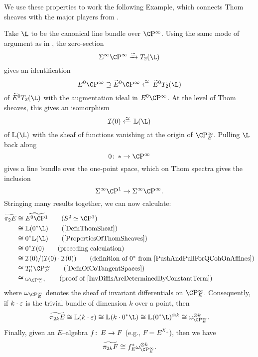 We use these properties to work the following Example, which connects Thom sheaves with the major players from .

\begin{example}\label{Pi2AndInvariantDiffls}
Take \(\L\) to be the canonical line bundle over \(\CP^\infty\).  Using the same mode of argument as in , the zero-section \[\Susp^\infty \CP^\infty \xrightarrow{\simeq} T_2(\L)\] gives an identification \[E^0 \CP^\infty \supseteq \widetilde E^0 \CP^\infty \xleftarrow{\simeq} \widetilde E^0 T_2(\L)\] of \(\widetilde E^0 T_2(\L)\) with the augmentation ideal in \(E^0 \CP^\infty\).  At the level of Thom sheaves, this gives an isomorphism \[\sheaf I(0) \xleftarrow{\simeq} \ThomSheaf{\L}\] of \(\ThomSheaf{\L}\) with the sheaf of functions vanishing at the origin of \(\CP^\infty_E\).  Pulling \(\L\) back along \[0\co * \to \CP^\infty\] gives a line bundle over the one-point space, which on Thom spectra gives the inclusion \[\Susp^\infty \CP^1 \to \Susp^\infty \CP^\infty.\]  Stringing many results together, we can now calculate:
\begin{align*}
\widetilde{\pi_2 E} & \cong \widetilde{E^0 \CP^1} \tag{\(S^2 \simeq \CP^1\)} \\
& \cong \ThomSheaf{0^* \L} \tag{\Cref{DefnThomSheaf}} \\
& \cong 0^* \ThomSheaf{\L} \tag{\Cref{PropertiesOfThomSheaves}} \\
& \cong 0^* \sheaf I(0) \tag{preceding calculation} \\
& \cong \sheaf I(0) / (\sheaf I(0) \cdot \sheaf I(0)) \tag{definition of \(0^*\) from \Cref{PushAndPullForQCohOnAffines}} \\
& \cong T^*_0 \CP^\infty_E \tag{\Cref{DefnOfCoTangentSpaces}} \\
& \cong \omega_{\CP^\infty_E}, \tag{proof of \Cref{InvDifflsAreDeterminedByConstantTerm}}
\end{align*}
where \(\omega_{\CP^\infty_E}\) denotes the sheaf of invariant differentials on \(\CP^\infty_E\).  Consequently, if \(k \cdot \varepsilon\) is the trivial bundle of dimension \(k\) over a point, then \[\widetilde{\pi_{2k} E} \cong \ThomSheaf{k \cdot \eps} \cong \ThomSheaf{k \cdot 0^* \L} \cong \ThomSheaf{0^* \L}^{\otimes k} \cong \omega_{\CP^\infty_E}^{\otimes k}.\]  Finally, given an \(E\)--algebra \(f \colon\thinspace E \to F\) (e.g., \(F = E^{X_+}\)), then we have \[\widetilde{\pi_{2k} F} \cong f_E^* \omega_{\CP^\infty_E}^{\otimes k}.\]
\end{example}

